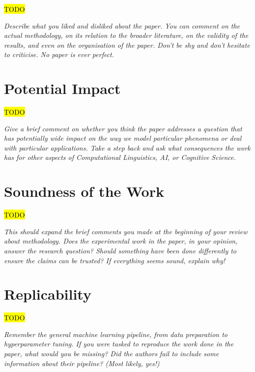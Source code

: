\documentclass[letterpaper,11pt]{article}
\begin{document}
\hl{TODO}

\textit{Describe what you liked and disliked about the paper. You can comment on the actual methodology, on its relation to the broader literature, on the validity of the results, and even on the organisation of the paper. Don't be shy and don't hesitate to criticise. No paper is ever perfect.}



\section{Potential Impact}

\hl{TODO}

\textit{Give a brief comment on whether you think the paper addresses a question that has potentially wide impact on the way we model particular phenomena or deal with particular applications. Take a step back and ask what consequences the work has for other aspects of Computational Linguistics, AI, or Cognitive Science.}




\section{Soundness of the Work}

\hl{TODO}

\textit{This should expand the brief comments you made at the beginning of your review about methodology. Does the experimental work in the paper, in your opinion, answer the research question? Should something have been done differently to ensure the claims can be trusted? If everything seems sound, explain why!}




\section{Replicability}

\hl{TODO}

\textit{Remember the general machine learning pipeline, from data preparation to hyperparameter tuning. If you were tasked to reproduce the work done in the paper, what would you be missing? Did the authors fail to include some information about their pipeline? (Most likely, yes!)}
\end{document}
